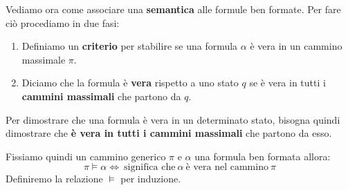 Vediamo ora come associare una \textbf{semantica} alle formule ben formate. Per fare ciò
procediamo in due fasi:
\begin{enumerate}
    \item Definiamo un \textbf{criterio} per stabilire se una formula $\alpha$ è vera in
          un cammino massimale $\pi$.
    \item Diciamo che la formula è \textbf{vera} rispetto a uno stato $q$ se è vera in
          tutti i \textbf{cammini massimali} che partono da $q$.
\end{enumerate}
\begin{nota}
    Per dimostrare che una formula è vera in un determinato stato, bisogna quindi
    dimostrare che \textbf{è vera in tutti i cammini massimali} che partono da esso.
\end{nota}
Fissiamo quindi un cammino generico $\pi$ e $\alpha$ una formula ben formata allora:
\begin{equation}
    \pi \vDash \alpha \iff \ \text{significa che} \ \alpha \ \text{è vera nel cammino}
    \ \pi
\end{equation}
Definiremo la relazione $\vDash$ per induzione.
